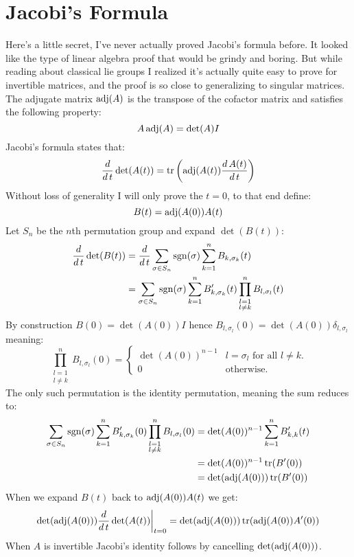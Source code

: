 
\section{Jacobi's Formula}
Here's a little secret,
I've never actually proved Jacobi's formula before.
It looked like the type of linear algebra proof that would be grindy and boring.
But while reading about classical lie groups I realized it's actually quite easy to prove for invertible matrices,
and the proof is so close to generalizing to singular matrices.
\\

The adjugate matrix $\operatorname{adj}(A)$ is the transpose of the cofactor matrix and satisfies the following property:
\[A\operatorname{adj}(A) = \det(A)I\]
Jacobi's formula states that:
\[\frac{d}{d\,t}\det(A(t)) = \operatorname{tr}\left(\operatorname{adj}(A(t))\frac{d\,A(t)}{d\,t}\right)\]
Without loss of generality I will only prove the $t=0$,
to that end define:
\[B(t)=\operatorname{adj}(A(0))A(t)\]
Let $S_n$ be the $n$th permutation group and expand $\det(B(t))$:
\[\begin{aligned}
	\frac{d}{d\,t}\det(B(t)) &= \frac{d}{d\,t}\sum_{\sigma\in S_n}\operatorname{sgn}(\sigma)\sum_{k=1}^nB_{k,\sigma_k}(t)\\ 
	&= \sum_{\sigma\in S_n}\operatorname{sgn}(\sigma)\sum_{k=1}^nB'_{k,\sigma_k}(t)\prod_{\substack{l=1\\l\neq k}}^nB_{l,\sigma_l}(t)\\ 
\end{aligned}\]
By construction $B(0)=\det(A(0))I$ hence $B_{l,\sigma_l}(0)=\det(A(0))\delta_{l,\sigma_l}$ meaning:
\[\prod_{\substack{l=1\\l\neq k}}^nB_{l,\sigma_l}(0) = \begin{cases} \det(A(0))^{n-1} & l=\sigma_l \text{ for all $l\neq k$.}\\ 0 & \text{otherwise.}\end{cases}\]
The only such permutation is the identity permutation, meaning the sum reduces to:
\[\begin{aligned}
	\sum_{\sigma\in S_n}\operatorname{sgn}(\sigma)\sum_{k=1}^nB'_{k,\sigma_k}(0)\prod_{\substack{l=1\\l\neq k}}^nB_{l,\sigma_l}(0)&= \det(A(0))^{n-1}\sum_{k=1}^nB'_{k,k}(t) \\
	&=\det(A(0))^{n-1}\operatorname{tr}(B'(0))\\
	&=\det(\operatorname{adj}(A(0)))\operatorname{tr}(B'(0))\\
\end{aligned}\]
When we expand $B(t)$ back to $\operatorname{adj}(A(0))A(t)$ we get:
\[ \det(\operatorname{adj}(A(0)))\frac{d}{d\,t}\det(A(t))\bigg|_{t=0} = \det(\operatorname{adj}(A(0)))\operatorname{tr}(\operatorname{adj}(A(0))A'(0)) \]
When $A$ is invertible Jacobi's identity follows by cancelling $\det(\operatorname{adj}(A(0)))$.

